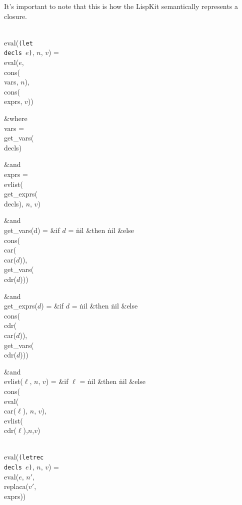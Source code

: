 It's important to note that this is how the LispKit semantically
represents a closure.

\bull
\\{eval}({\tt (let \\{decls} $e$)}, $n$, $v$) =
\\{eval}($e$, \\{cons}(\\{vars}, $n$), \\{cons}(\\{exprs}, $v$))

\&{where} \\{vars} = \\{get\_vars}(\\{decls})

\&{and}
\\{exprs} = \\{evlist}(\\{get\_exprs}(\\{decls}), $n$, $v$)

\&{and}
\\{get\_vars}(d) = \&{if} $d$ = \.{nil} \&{then} \.{nil}
\&{else} \\{cons}(\\{car}(\\{car}($d$)),\\{get\_vars}(\\{cdr}($d$)))

\&{and} \\{get\_exprs}($d$) = \&{if} $d$ = \.{nil} \&{then} \.{nil}
\&{else} \\{cons}(\\{cdr}(\\{car}($d$)),\\{get\_vars}(\\{cdr}($d$)))

\&{and} \\{evlist}($\ell$, $n$, $v$) = \&{if} $\ell$ = \.{nil} \&{then}
\.{nil} \&{else} \\{cons}(\\{eval}(\\{car}($\ell$), $n$, $v$), \\{evlist}(%
\\{cdr}($\ell$),$n$,$v$)

\bull
\\{eval}({\tt (letrec \\{decls} $e$)}, $n$, $v$) =
\\{eval}($e$, $n'$, \\{replaca}($v'$, \\{exprs}))

